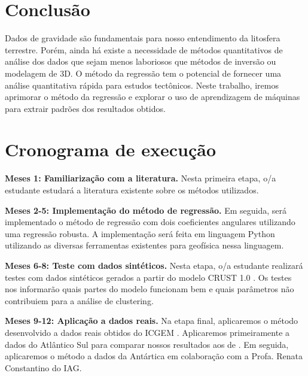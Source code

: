 \documentclass[onecolumn,a4paper,11pt]{article}
\begin{document}
\section{Conclusão}

Dados de gravidade são fundamentais para nosso entendimento da litosfera
terrestre. Porém, ainda há existe a necessidade de métodos quantitativos de
análise dos dados que sejam menos laboriosos que métodos de inversão ou
modelagem de 3D. O método da regressão tem o potencial de fornecer uma análise
quantitativa rápida para estudos tectônicos. Neste trabalho, iremos aprimorar
o método da regressão e explorar o uso de aprendizagem de máquinas para extrair
padrões dos resultados obtidos.

\section{Cronograma de execução}

\noindent
\textbf{Meses 1: Familiarização com a literatura.}
Nesta primeira etapa, o/a estudante estudará a literatura existente sobre
os métodos utilizados.

\noindent
\textbf{Meses 2-5: Implementação do método de regressão.}
Em seguida, será implementado o método de regressão com dois coeficientes angulares utilizando uma regressão robusta. A implementação será feita em linguagem Python utilizando as diversas ferramentas existentes para geofísica nessa linguagem.

\noindent
\textbf{Meses 6-8: Teste com dados sintéticos.}
Nesta etapa, o/a estudante realizará testes com dados sintéticos gerados a partir do modelo CRUST 1.0 \citep{Laske2013}. Os testes nos informarão quais partes do modelo funcionam bem e quais parâmetros não contribuiem para a análise de clustering.

\noindent
\textbf{Meses 9-12: Aplicação a dados reais.}
Na etapa final, aplicaremos o método desenvolvido a dados reais obtidos do ICGEM \citep{Ince2019}. Aplicaremos primeiramente a dados do Atlântico Sul para comparar nossos resultados aos de \citet{Pivetta2020}. Em seguida, aplicaremos o método a dados da Antártica em colaboração com a Profa. Renata Constantino do IAG.



\end{document}
